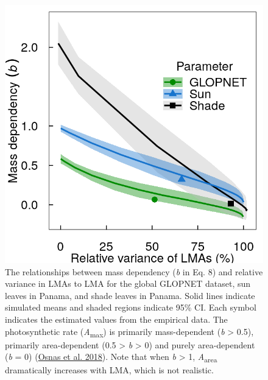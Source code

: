 \documentclass[
  12pt,
  a4paper,
,tablecaptionabove
]{scrartcl}
\begin{document}
\begin{figure}
\hypertarget{fig:massplt}{%
\centering
\includegraphics{../figs/mass_prop_mv.png}
\caption{The relationships between mass dependency (\emph{b} in Eq. 8) and relative variance in LMAs to LMA for the global GLOPNET dataset, sun leaves in Panama, and shade leaves in Panama.
Solid lines indicate simulated means and shaded regions indicate 95\% CI.
Each symbol indicates the estimated values from the empirical data.
The photosynthetic rate (\emph{A}\textsubscript{max}) is primarily mass-dependent (\emph{b} \textgreater{} 0.5), primarily area-dependent (0.5 \textgreater{} \emph{b} \textgreater{} 0) and purely area-dependent (\emph{b} = 0) (\protect\hyperlink{ref-Osnas2018}{Osnas et al. 2018}).
Note that when \emph{b} \textgreater{} 1, \emph{A}\textsubscript{area} dramatically increases with LMA, which is not realistic.}\label{fig:massplt}
}
\end{figure}

\newpage
\end{document}
